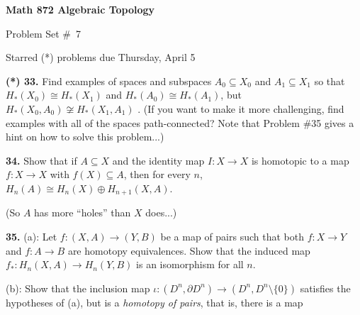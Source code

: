 

\overfullrule=0pt
\parindent=0pt
\nopagenumbers




\loadmsbm

\def\ctln{\centerline}
\def\u{\underbar}
\def\ssk{\smallskip}
\def\msk{\medskip}
\def\bsk{\bigskip}
\def\hsk{\hskip.1in}
\def\hhsk{\hskip.2in}

\def\dsl{\displaystyle}
\def\hskp{\hskip1.5in}
\def\ra{\rightarrow}
\def\lra{$\Leftrightarrow$}
\def\pu{\pi_1}
\def\mpu{$\pi_1$}
\def\bra{$\Rightarrow$}
\def\bbr{{\Bbb R}}
\def\bbz{{\Bbb Z}}
\def\bbq{{\Bbb Q}}
\def\del{\partial}
\def\indt{\item{}}
\def\wtl{\widetilde}
\def\coker{\text{coker}}
\def\im{\text{im}}
\def\wtih{\widetilde{H}}

\ctln{\bf Math 872 Algebraic Topology}

\ssk

\ctln{Problem Set \#\ 7}

\ssk

\ctln{Starred (*) problems due Thursday, April 5}

\bsk

\item{\bf (*) 33.} Find examples of spaces and subspaces
$A_0\subseteq X_0$ and $A_1\subseteq X_1$ so that
$H_*(X_0)\cong H_*(X_1)$ and $H_*(A_0)\cong H_*(A_1)$,
but $H_*(X_0,A_0)\not\cong H_*(X_1,A_1)$ . (If you want to make
it more challenging, find examples with all of the spaces path-connected?
Note that Problem \#35 gives a hint on how \u{not} to solve this problem...)

\msk

\item{\bf 34.} Show that if $A\subseteq X$ and the identity map 
$I:X\ra X$ is homotopic 
to a map $f:X\ra X$ with $f(X)\subseteq A$, then
for every $n$, $H_n(A)\cong H_n(X)\oplus H_{n+1}(X,A)$.

\item{} (So $A$ has more ``holes'' than $X$ does...)

\msk

\item{\bf 35.} (a): Let $f:(X,A)\ra (Y,B)$ be a map of pairs such that
both $f:X\ra Y$ and $f:A\ra B$ are homotopy equivalences. Show that
the induced map $f_*:H_n(X,A)\ra H_n(Y,B)$ is an isomorphism for all $n$.

\ssk

\item{} (b): Show that the inclusion map $\iota:(D^n,\del D^n)\ra (D^n,D^n\setminus \{0\})$
satisfies the hypotheses of (a), but is \u{not} a {\it homotopy of pairs}, that is, there
is \u{not} a map 

